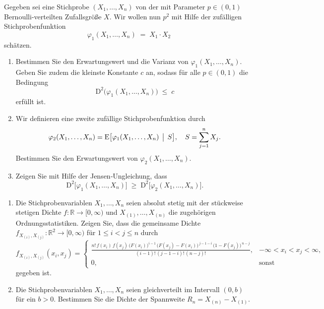 \begin{aufgabe}
Gegeben sei eine Stichprobe \((X_1,\dots,X_n)\) von der mit Parameter \(p\in(0,1)\) Bernoulli‑verteilten Zufallsgröße \(X\). Wir wollen nun \(p^2\) mit Hilfe der zufälligen Stichprobenfunktion
\[
  \varphi_1(X_1,\dots,X_n) \;=\; X_1 \cdot X_2
\]
schätzen.
\begin{enumerate}
  \item Bestimmen Sie den Erwartungswert und die Varianz von \(\varphi_1(X_1,\dots,X_n)\). Geben Sie zudem die kleinste Konstante \(c\) an, sodass für alle \(p\in(0,1)\) die Bedingung
  \[
    \mathrm{D}^2\bigl(\varphi_1(X_1,\dots,X_n)\bigr) \;\le\; c
  \]
  erfüllt ist.
  \item Wir definieren eine zweite zufällige Stichprobenfunktion durch
  \[
    \varphi_2(X_1,\dots,X_n)
    = \mathrm{E}\bigl[\varphi_1(X_1,\dots,X_n)\,\bigm|\,S\bigr],
    \quad
    S = \sum_{j=1}^n X_j.
  \]
  Bestimmen Sie den Erwartungswert von \(\varphi_2(X_1,\dots,X_n)\).
  \item Zeigen Sie mit Hilfe der Jensen‑Ungleichung, dass
  \[
    \mathrm{D}^2\bigl[\varphi_1(X_1,\dots,X_n)\bigr]
    \;\ge\;
    \mathrm{D}^2\bigl[\varphi_2(X_1,\dots,X_n)\bigr].
  \]
\end{enumerate}
\end{aufgabe}

\begin{aufgabe}
\begin{enumerate}
  \item Die Stichprobenvariablen \(X_1,\dots,X_n\) seien absolut stetig mit der stückweise stetigen Dichte \(f\colon\mathbb{R}\to[0,\infty)\) und \(X_{(1)},\dots,X_{(n)}\) die zugehörigen Ordnungsstatistiken. Zeigen Sie, dass die gemeinsame Dichte \(f_{X_{(i)},X_{(j)}}\colon\mathbb{R}^2\to[0,\infty)\) für \(1\le i<j\le n\) durch
  \[
    f_{X_{(i)},X_{(j)}}(x_i,x_j)
    =
    \begin{cases}
      \displaystyle
      \frac{n!\,f(x_i)\,f(x_j)\,\bigl(F(x_i)\bigr)^{i-1}\,\bigl(F(x_j)-F(x_i)\bigr)^{\,j-1-i}\,\bigl(1-F(x_j)\bigr)^{\,n-j}}
           {(i-1)!\,(j-1-i)!\,(n-j)!}, 
      & -\infty<x_i<x_j<\infty,\\
      0, & \text{sonst}
    \end{cases}
  \]
  gegeben ist.
  \item Die Stichprobenvariablen \(X_1,\dots,X_n\) seien gleichverteilt im Intervall \((0,b)\) für ein \(b>0\). Bestimmen Sie die Dichte der Spannweite \(R_n = X_{(n)} - X_{(1)}\).
\end{enumerate}
\end{aufgabe}


